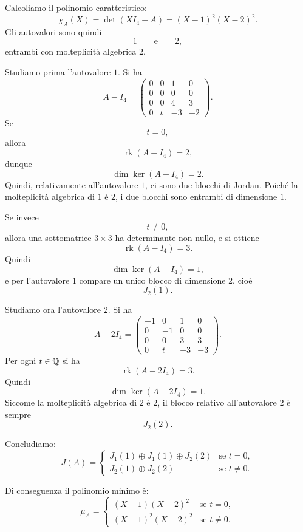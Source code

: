 \documentclass[a4paper]{article}
\begin{document}
\begin{radioactive}
\begin{snippetsolution}{}
    Calcoliamo il polinomio caratteristico:
    \[
        \chi_A(X)
        =
        \det(XI_4-A)
        =
        (X-1)^2(X-2)^2.
    \]
    Gli autovalori sono quindi
    \[
        1
        \qquad
        \text{e}
        \qquad
        2,
    \]
    entrambi con molteplicità algebrica \(2\).

    Studiamo prima l'autovalore \(1\). Si ha
    \[
        A-I_4=
        \begin{pmatrix}
            0 & 0 & 1 & 0\\
            0 & 0 & 0 & 0\\
            0 & 0 & 4 & 3\\
            0 & t & -3 & -2
        \end{pmatrix}.
    \]
    Se
    \[
        t=0,
    \]
    allora
    \[
        \operatorname{rk}(A-I_4)=2,
    \]
    dunque
    \[
        \dim\ker(A-I_4)=2.
    \]
    Quindi, relativamente all'autovalore \(1\), ci sono due blocchi di Jordan. Poiché la molteplicità algebrica di \(1\) è \(2\), i due blocchi sono entrambi di dimensione \(1\).

    Se invece
    \[
        t\neq 0,
    \]
    allora una sottomatrice \(3\times 3\) ha determinante non nullo, e si ottiene
    \[
        \operatorname{rk}(A-I_4)=3.
    \]
    Quindi
    \[
        \dim\ker(A-I_4)=1,
    \]
    e per l'autovalore \(1\) compare un unico blocco di dimensione \(2\), cioè
    \[
        J_2(1).
    \]

    Studiamo ora l'autovalore \(2\). Si ha
    \[
        A-2I_4=
        \begin{pmatrix}
            -1 & 0 & 1 & 0\\
            0 & -1 & 0 & 0\\
            0 & 0 & 3 & 3\\
            0 & t & -3 & -3
        \end{pmatrix}.
    \]
    Per ogni \(t\in\mathbb{Q}\) si ha
    \[
        \operatorname{rk}(A-2I_4)=3.
    \]
    Quindi
    \[
        \dim\ker(A-2I_4)=1.
    \]
    Siccome la molteplicità algebrica di \(2\) è \(2\), il blocco relativo all'autovalore \(2\) è sempre
    \[
        J_2(2).
    \]

    Concludiamo:
    \[
        J(A)=
        \begin{cases}
            J_1(1)\oplus J_1(1)\oplus J_2(2)
            & \text{se } t=0,\\[4pt]
            J_2(1)\oplus J_2(2)
            & \text{se } t\neq 0.
        \end{cases}
    \]

    Di conseguenza il polinomio minimo è:
    \[
        \mu_A=
        \begin{cases}
            (X-1)(X-2)^2
            & \text{se } t=0,\\[4pt]
            (X-1)^2(X-2)^2
            & \text{se } t\neq 0.
        \end{cases}
    \]
\end{snippetsolution}
\end{radioactive}
\end{document}
